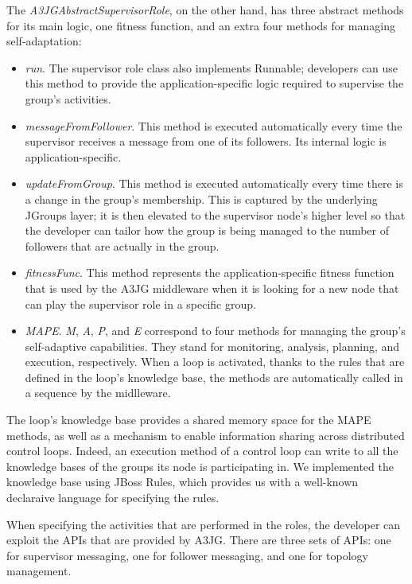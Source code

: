 The \emph{A3JGAbstractSupervisorRole}, on the other hand, has three abstract methods for its main logic, one fitness function, and an extra four methods for managing self-adaptation:

\begin{itemize}
	\item \emph{run}. The supervisor role class also implements Runnable; developers can use this method to provide the application-specific logic required to supervise the group's activities.
	\item \emph{messageFromFollower}. This method is executed automatically every time the supervisor receives a message from one of its followers. Its internal logic is application-specific.
	\item \emph{updateFromGroup}. This method is executed automatically every time there is a change in the group's membership. This is captured by the underlying JGroups layer; it is then elevated to the supervisor node's higher level so that the developer can tailor how the group is being managed to the number of followers that are actually in the group.  
	\item \emph{fitnessFunc}. This method represents the application-specific fitness function that is used by the A3JG middleware when it is looking for a new node that can play the supervisor role in a specific group.
	\item \emph{MAPE}. \emph{M}, \emph{A}, \emph{P}, and \emph{E} correspond to four methods for managing the group's self-adaptive capabilities. They stand for monitoring, analysis, planning, and execution, respectively. When a loop is activated, thanks to the rules that are defined in the loop's knowledge base, the methods are automatically called in a sequence by the midlleware.
\end{itemize}

The loop's knowledge base provides a shared memory space for the MAPE methods, as well as a mechanism to enable information sharing across distributed control loops. Indeed, an execution method of a control loop can write to all the knowledge bases of the groups its node is participating in. We implemented the knowledge base using JBoss Rules, which provides us with a well-known declaraive language for specifying the rules. 

When specifying the activities that are performed in the roles, the developer can exploit the APIs that are provided by A3JG. There are three sets of APIs: one for supervisor messaging, one for follower messaging, and one for topology management. 

